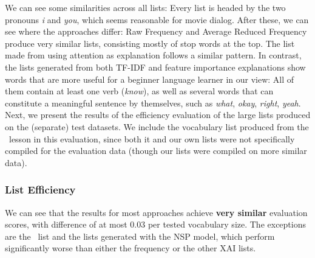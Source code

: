 We can see some similarities across all lists:
Every list is headed by the two pronouns \textit{i} and \textit{you}, which seems reasonable for movie dialog.
After these, we can see where the approaches differ:
Raw Frequency and Average Reduced Frequency produce very similar lists, consisting mostly of stop words at the top.
The list made from using attention as explanation follows a similar pattern.
In contrast, the lists generated from both TF-IDF and feature importance explanations show words that are more useful for a beginner language learner in our view:
All of them contain at least one verb (\textit{know}), as well as several words that can constitute a meaningful sentence by themselves, such as \textit{what}, \textit{okay}, \textit{right}, \textit{yeah}.
Next, we present the results of the efficiency evaluation of the large lists produced on the (separate) test datasets.
We include the vocabulary list produced from the \Rosetta\ lesson in this evaluation, since both it and our own lists were not specifically compiled for the evaluation data (though our lists were compiled on more similar data).


% 		
%
%
% 		


\subsubsection{List Efficiency}


We can see that the results for most approaches achieve \textbf{very similar} evaluation scores, with difference of at most 0.03 per tested vocabulary size.
The exceptions are the \Rosetta\ list and the lists generated with the NSP model, which perform significantly worse than either the frequency or the other XAI lists.

